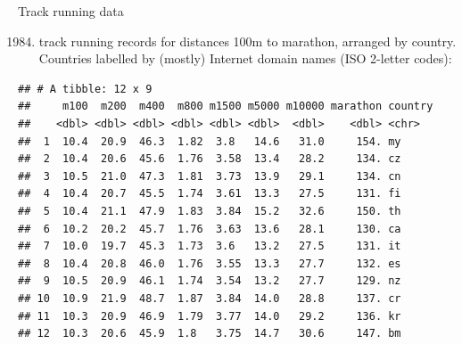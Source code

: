 \documentclass[ignorenonframetext,]{beamer}
\newenvironment{Shaded}{\begin{snugshade}}{\end{snugshade}}
\newcommand{\DecValTok}[1]{\textcolor[rgb]{0.00,0.00,0.81}{#1}}
\newcommand{\KeywordTok}[1]{\textcolor[rgb]{0.13,0.29,0.53}{\textbf{#1}}}
\newcommand{\NormalTok}[1]{#1}
\newcommand{\OperatorTok}[1]{\textcolor[rgb]{0.81,0.36,0.00}{\textbf{#1}}}
\newcommand{\StringTok}[1]{\textcolor[rgb]{0.31,0.60,0.02}{#1}}
\providecommand{\tightlist}{%
  \setlength{\itemsep}{0pt}\setlength{\parskip}{0pt}}
\begin{document}
\begin{frame}[fragile]{Track running data}
\protect\hypertarget{track-running-data}{}

\begin{enumerate}
[(1)]
\setcounter{enumi}{1983}
\tightlist
\item
  track running records for distances 100m to marathon, arranged by
  country. Countries labelled by (mostly) Internet domain names (ISO
  2-letter codes):
\end{enumerate}

\begin{Shaded}
\end{Shaded}

\begin{verbatim}
## # A tibble: 12 x 9
##     m100  m200  m400  m800 m1500 m5000 m10000 marathon country
##    <dbl> <dbl> <dbl> <dbl> <dbl> <dbl>  <dbl>    <dbl> <chr>  
##  1  10.4  20.9  46.3  1.82  3.8   14.6   31.0     154. my     
##  2  10.4  20.6  45.6  1.76  3.58  13.4   28.2     134. cz     
##  3  10.5  21.0  47.3  1.81  3.73  13.9   29.1     134. cn     
##  4  10.4  20.7  45.5  1.74  3.61  13.3   27.5     131. fi     
##  5  10.4  21.1  47.9  1.83  3.84  15.2   32.6     150. th     
##  6  10.2  20.2  45.7  1.76  3.63  13.6   28.1     130. ca     
##  7  10.0  19.7  45.3  1.73  3.6   13.2   27.5     131. it     
##  8  10.4  20.8  46.0  1.76  3.55  13.3   27.7     132. es     
##  9  10.5  20.9  46.1  1.74  3.54  13.2   27.7     129. nz     
## 10  10.9  21.9  48.7  1.87  3.84  14.0   28.8     137. cr     
## 11  10.3  20.9  46.9  1.79  3.77  14.0   29.2     136. kr     
## 12  10.3  20.6  45.9  1.8   3.75  14.7   30.6     147. bm
\end{verbatim}

\end{frame}
\end{document}
